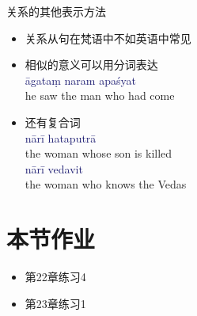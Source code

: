 \documentclass[17pt]{beamer}
\newcommand{\fullsentence}[1]{\textcolor{MidnightBlue}{#1}}
\begin{document}
\begin{frame}{关系的其他表示方法}
  \small
  \centering
  \begin{itemize}
    \item 关系从句在梵语中不如英语中常见
    \item 相似的意义可以用分词表达\\
    \fullsentence{āgataṃ naram apaśyat} \\he saw the man who had come
    \item 还有复合词\\    
    \fullsentence{nārī hataputrā} \\the woman whose son is killed\\
    \fullsentence{nārī vedavit} \\the woman who knows the Vedas
  \end{itemize}  
\end{frame}

\section{本节作业}

\begin{frame}{\insertsection }
  \begin{itemize}
    \item
      第22章练习4
    \item 
      第23章练习1
  \end{itemize}
\end{frame}  
\end{document}
